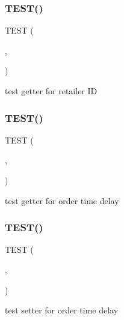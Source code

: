 \subsubsection{\texorpdfstring{T\+E\+S\+T()}{TEST()}\hspace{0.1cm}{\footnotesize\ttfamily [16/54]}}
{\footnotesize\ttfamily T\+E\+ST (\begin{DoxyParamCaption}\item[{game\+Test}]{,  }\item[{get\+P\+Retailer\+Id\+Test}]{ }\end{DoxyParamCaption})}

test getter for retailer ID \mbox{\label{group__group2_gadec269e4bc1adbd9372ba122f839d151}} 
\subsubsection{\texorpdfstring{T\+E\+S\+T()}{TEST()}\hspace{0.1cm}{\footnotesize\ttfamily [17/54]}}
{\footnotesize\ttfamily T\+E\+ST (\begin{DoxyParamCaption}\item[{gam\+Test}]{,  }\item[{get\+Order\+Time\+Delay\+Test}]{ }\end{DoxyParamCaption})}

test getter for order time delay \mbox{\label{group__group2_ga7200f183103052a104c989a23e1799fc}} 
\subsubsection{\texorpdfstring{T\+E\+S\+T()}{TEST()}\hspace{0.1cm}{\footnotesize\ttfamily [18/54]}}
{\footnotesize\ttfamily T\+E\+ST (\begin{DoxyParamCaption}\item[{gam\+Test}]{,  }\item[{set\+Order\+Time\+Delay\+Test}]{ }\end{DoxyParamCaption})}

test setter for order time delay \mbox{\label{group__group2_ga4b0d92f6129a69054e355b91993f098d}} 
